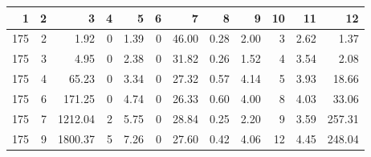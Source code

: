 \begin{tabular}{rrrrrrrrrrrr}
\toprule
1 & 2 & 3 & 4 & 5 & 6 & 7 & 8 & 9 & 10 & 11 & 12 \\
\midrule
175 & 2 & 1.92 & 0 & 1.39 & 0 & 46.00 & 0.28 & 2.00 & 3 & 2.62 & 1.37 \\
175 & 3 & 4.95 & 0 & 2.38 & 0 & 31.82 & 0.26 & 1.52 & 4 & 3.54 & 2.08 \\
175 & 4 & 65.23 & 0 & 3.34 & 0 & 27.32 & 0.57 & 4.14 & 5 & 3.93 & 18.66 \\
175 & 6 & 171.25 & 0 & 4.74 & 0 & 26.33 & 0.60 & 4.00 & 8 & 4.03 & 33.06 \\
175 & 7 & 1212.04 & 2 & 5.75 & 0 & 28.84 & 0.25 & 2.20 & 9 & 3.59 & 257.31 \\
175 & 9 & 1800.37 & 5 & 7.26 & 0 & 27.60 & 0.42 & 4.06 & 12 & 4.45 & 248.04 \\
\bottomrule
\end{tabular}
